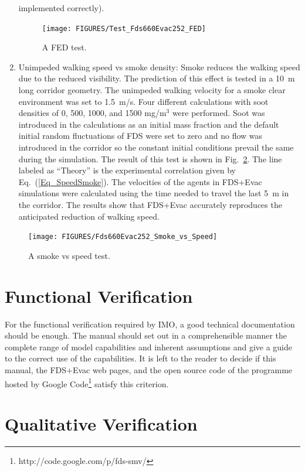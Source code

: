 \documentclass[12pt,a4paper,final,twoside]{stylevk}
\begin{document}
\begin{enumerate}
  implemented correctly).
%
\begin{figure}[!tb]
  \centerline{\texttt{[image: FIGURES/Test\_Fds660Evac252\_FED]}} 
  \caption{A FED test.}\label{Fig_FED_Test}
\end{figure}
%
\item Unimpeded walking speed vs smoke density: Smoke reduces the
  walking speed due to the reduced visibility.  The prediction of this
  effect is tested in a 10~m long corridor geometry.  The unimpeded
  walking velocity for a smoke clear environment was set to 1.5~m/s.
  Four different calculations with soot densities of 0, 500, 1000, and
  1500 mg/m${}^\textrm{3}$ were performed.  Soot was introduced in the
  calculations as an initial mass fraction and the default initial
  random fluctuations of FDS were set to zero and no flow was
  introduced in the corridor so the constant initial conditions
  prevail the same during the simulation.  The result of this test is
  shown in Fig.~\ref{Fig_SmokeSpeedTest}.  The line labeled as
  ``Theory'' is the experimental correlation given by
  Eq.~(\ref{Eq_SpeedSmoke}).  The velocities of the agents in FDS+Evac
  simulations were calculated using the time needed to travel the last
  5~m in the corridor.  The results show that FDS+Evac accurately
  reproduces the anticipated reduction of walking speed.
%
\end{enumerate}
%
%
\begin{figure}[!tb]
  \centerline{\texttt{[image: FIGURES/Fds660Evac252\_Smoke\_vs\_Speed]}}   
  \caption{A smoke vs speed test.}\label{Fig_SmokeSpeedTest}
\end{figure}
%


\section{Functional Verification}\label{Sec_FuncVeri}

\noindent For the functional verification required by IMO, a good
technical documentation should be enough.  The manual should set out
in a comprehensible manner the complete range of model capabilities
and inherent assumptions and give a guide to the correct use of the
capabilities.  It is left to the reader to decide if this manual, the
FDS+Evac web pages, and the open source code of the programme hosted
by Google Code\footnote{http://code.google.com/p/fds-smv/} satisfy
this criterion.


\section{Qualitative Verification}\label{Sec_QualVeri}
\end{document}
